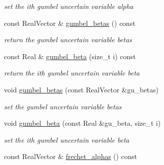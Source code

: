 \begin{DoxyCompactItemize}
\begin{DoxyCompactList}\small\item\em set the ith gumbel uncertain variable alpha \end{DoxyCompactList}\item 
const Real\+Vector \& \hyperlink{classPecos_1_1AleatoryDistParams_a5909ada1bec4239c98e6fd13fd725ab9}{gumbel\+\_\+betas} () const \label{classPecos_1_1AleatoryDistParams_a5909ada1bec4239c98e6fd13fd725ab9}

\begin{DoxyCompactList}\small\item\em return the gumbel uncertain variable betas \end{DoxyCompactList}\item 
const Real \& \hyperlink{classPecos_1_1AleatoryDistParams_a2c8281b30aaef30b74883b957c2b642f}{gumbel\+\_\+beta} (size\+\_\+t i) const \label{classPecos_1_1AleatoryDistParams_a2c8281b30aaef30b74883b957c2b642f}

\begin{DoxyCompactList}\small\item\em return the ith gumbel uncertain variable beta \end{DoxyCompactList}\item 
void \hyperlink{classPecos_1_1AleatoryDistParams_a071a71316b0288907973db2f7051d9f4}{gumbel\+\_\+betas} (const Real\+Vector \&gu\+\_\+betas)\label{classPecos_1_1AleatoryDistParams_a071a71316b0288907973db2f7051d9f4}

\begin{DoxyCompactList}\small\item\em set the gumbel uncertain variable betas \end{DoxyCompactList}\item 
void \hyperlink{classPecos_1_1AleatoryDistParams_abc753ee71aca277cb0db46beb68b5ea5}{gumbel\+\_\+beta} (const Real \&gu\+\_\+beta, size\+\_\+t i)\label{classPecos_1_1AleatoryDistParams_abc753ee71aca277cb0db46beb68b5ea5}

\begin{DoxyCompactList}\small\item\em set the ith gumbel uncertain variable beta \end{DoxyCompactList}\item 
const Real\+Vector \& \hyperlink{classPecos_1_1AleatoryDistParams_a7b8d3a38e87a071f8a3c71ad74487a14}{frechet\+\_\+alphas} () const \label{classPecos_1_1AleatoryDistParams_a7b8d3a38e87a071f8a3c71ad74487a14}


\end{DoxyCompactItemize}
